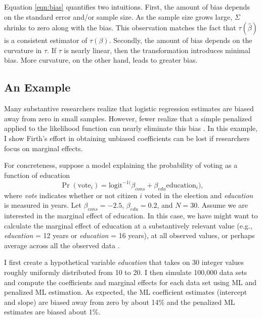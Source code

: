 \documentclass[12pt]{article}
\begin{document}
Equation \ref{eqn:bias} quantifies two intuitions. First, the amount of bias depends on the standard error and/or sample size. As the sample size grows large, $\Sigma$ shrinks to zero along with the bias. This observation matches the fact that $\tau(\hat{\beta})$ is a consistent estimator of $\tau(\beta)$. Secondly, the amount of bias depends on the curvature in $\tau$. If $\tau$ is nearly linear, then the transformation introduces minimal bias. More curvature, on the other hand, leads to greater bias. 

\subsection*{An Example}

Many substantive researchers realize that logistic regression estimates are biased away from zero in small samples. However, fewer realize that a simple penalized applied to the likelihood function can nearly eliminate this bias \citep{Firth1993}. In this example, I show Firth's effort in obtaining unbiased coefficients can be lost if researchers focus on marginal effects.

For concreteness, suppose a model explaining the probability of voting as a function of education
\begin{equation}
\Pr (\text{vote}_i) = \text{logit}^{-1(}\beta_{cons} + \beta_{edu} \text{education}_i) \text{,}\nonumber
\end{equation}
where \textit{vote} indicates whether or not citizen $i$ voted in the election and \textit{education} is measured in years. Let $\beta_{cons} = -2.5$, $\beta_{edu} = 0.2$, and $N = 30$. Assume we are interested in the marginal effect of education. In this case, we have might want to calculate the marginal effect of education at a substantively relevant value (e.g., \textit{education} = 12 years or \textit{education} = 16 years), at all observed values, or perhaps average across all the observed data \citep{HanmerKalkan2013}.

I first create a hypothetical variable \textit{education} that takes on 30 integer values roughly uniformly distributed from 10 to 20. I then simulate 100,000 data sets and compute the coefficients and marginal effects for each data set using ML and penalized ML estimation. As expected, the ML coefficient estimates (intercept and slope) are biased away from zero by about 14\% and the penalized ML estimates are biased about 1\%.
\end{document}
